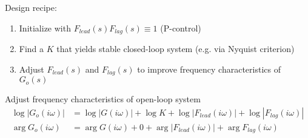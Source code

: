 \documentclass{article}
\begin{document}
Design recipe:
\begin{enumerate}
    \item Initialize with $F_{lead}(s) F_{lag}(s) \equiv 1$ (P-control)
    \item Find a $K$ that yields stable closed-loop system (e.g. via Nyquist criterion)
    \item Adjust $F_{lead}(s)$ and $F_{lag}(s)$ to improve frequency characteristics of $G_o(s)$
\end{enumerate}

Adjust frequency characteristics of open-loop system
\begin{align*}
    \log|G_o(i\omega)| &= \log|G(i\omega)| + \log{K} + \log{|F_{lead}(i\omega)|} + \log{|F_{lag}(i\omega)|} \\
    \arg{G_o(i\omega)} &= \arg{G(i\omega)} + 0 + \arg{|{F_{lead}(i\omega)|} + \arg{F_{lag}(i\omega)}}
\end{align*}
\end{document}
